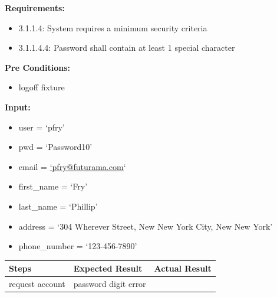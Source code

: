 \documentclass[letterpaper,10pt,english]{sphinxmanual}
\begin{document}
\begin{fulllineitems}
\label{STD/test_password:test_password.test_password_special_char}
\textbf{Requirements:}
\begin{itemize}
\item {} 
3.1.1.4: System requires a minimum security criteria

\item {} 
3.1.1.4.4: Password shall contain at least 1 special character

\end{itemize}

\textbf{Pre Conditions:}
\begin{itemize}
\item {} 
logoff fixture

\end{itemize}

\textbf{Input:}
\begin{itemize}
\item {} 
user = `pfry'

\item {} 
pwd = `Password10'

\item {} 
email = \href{mailto:'pfry@futurama.com}{`pfry@futurama.com}`

\item {} 
first\_name = `Fry'

\item {} 
last\_name = `Phillip'

\item {} 
address = `304 Wherever Street, New New York City, New New York'

\item {} 
phone\_number = `123-456-7890'

\end{itemize}

\begin{tabulary}{\linewidth}{|L|L|L|}
\hline
\textsf{\relax 
Steps
} & \textsf{\relax 
Expected Result
} & \textsf{\relax 
Actual Result
}\\
\hline
request account
 & 
password digit error
 & \\
\hline\end{tabulary}


\end{fulllineitems}

\end{document}
